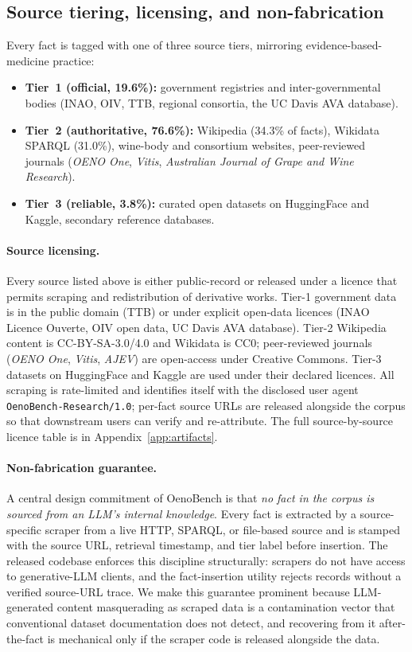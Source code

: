 \subsection{Source tiering, licensing, and non-fabrication}
\label{sec:sources}
Every fact is tagged with one of three source tiers, mirroring
evidence-based-medicine practice:
\begin{itemize}\itemsep -1pt
  \item \textbf{Tier~1 (official, 19.6\%):} government registries and
    inter-governmental bodies (INAO, OIV, TTB, regional consortia, the
    UC Davis AVA database).
  \item \textbf{Tier~2 (authoritative, 76.6\%):} Wikipedia (34.3\% of
    facts), Wikidata SPARQL (31.0\%), wine-body and consortium websites,
    peer-reviewed journals (\emph{OENO One}, \emph{Vitis}, \emph{Australian
    Journal of Grape and Wine Research}).
  \item \textbf{Tier~3 (reliable, 3.8\%):} curated open datasets on
    HuggingFace and Kaggle, secondary reference databases.
\end{itemize}

\paragraph{Source licensing.}
Every source listed above is either public-record or released under a
licence that permits scraping and redistribution of derivative works.
Tier-1 government data is in the public domain (TTB) or under
explicit open-data licences (INAO Licence Ouverte, OIV open data, UC
Davis AVA database). Tier-2 Wikipedia content is CC-BY-SA-3.0/4.0 and
Wikidata is CC0; peer-reviewed journals (\emph{OENO One}, \emph{Vitis},
\emph{AJEV}) are open-access under Creative Commons. Tier-3 datasets
on HuggingFace and Kaggle are used under their declared licences. All
scraping is rate-limited and identifies itself with the disclosed user
agent \texttt{OenoBench-Research/1.0}; per-fact source URLs are
released alongside the corpus so that downstream users can verify and
re-attribute. The full source-by-source licence table is in
Appendix~\ref{app:artifacts}.

\paragraph{Non-fabrication guarantee.}
A central design commitment of OenoBench is that \emph{no fact in the
corpus is sourced from an LLM's internal knowledge}. Every fact is
extracted by a source-specific scraper from a live HTTP, SPARQL, or
file-based source and is stamped with the source URL, retrieval
timestamp, and tier label before insertion. The released codebase
enforces this discipline structurally: scrapers do not have access to
generative-LLM clients, and the fact-insertion utility rejects records
without a verified source-URL trace. We make this guarantee
prominent because LLM-generated content masquerading as scraped data
is a contamination vector that conventional dataset documentation
does not detect, and recovering from it after-the-fact is mechanical
only if the scraper code is released alongside the data.

